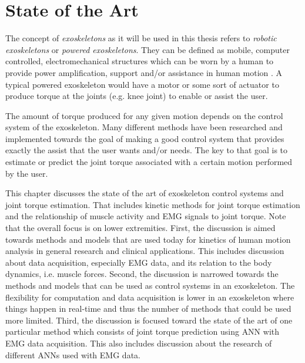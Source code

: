\documentclass[../main.tex]{subfiles}
\begin{document}
\chapter{State of the Art}
The concept of \textit{exoskeletons} as it will be used in this thesis refers to \textit{robotic exoskeletons} or \textit{powered exoskeletons}. 
They can be defined as mobile, computer controlled, electromechanical structures which can be worn by a human to provide power amplification, support and/or assistance in human motion \cite{Anam2012, Gorgey2018}. 
A typical powered exoskeleton would have a motor or some sort of actuator to produce torque at the joints (e.g. knee joint) to enable or assist the user.

The amount of torque produced for any given motion depends on the control system of the exoskeleton.
Many different methods have been researched and implemented towards the goal of making a good control system that provides exactly the assist that the user wants and/or needs.
The key to that goal is to estimate or predict the joint torque associated with a certain motion performed by the user.

This chapter discusses the state of the art of exoskeleton control systems and joint torque estimation.
That includes kinetic methods for joint torque estimation and the relationship of muscle activity and \ac{EMG} signals to joint torque.
Note that the overall focus is on lower extremities.
First, the discussion is aimed towards methods and models that are used today for kinetics of human motion analysis in general research and clinical applications.
This includes discussion about data acquisition, especially \ac{EMG} data, and its relation to the body dynamics, i.e. muscle forces.
Second, the discussion is narrowed towards the methods and models that can be used as control systems in an exoskeleton.
The flexibility for computation and data acquisition is lower in an exoskeleton where things happen in real-time and thus the number of methods that could be used more limited.
Third, the discussion is focused toward the state of the art of one particular method which consists of joint torque prediction using \ac{ANN} with \ac{EMG} data acquisition. 
This also includes discussion about the research of different \acp{ANN} used with \ac{EMG} data.
\end{document}
